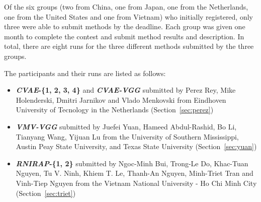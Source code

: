 \documentclass[../main.tex]{subfiles}
\begin{document}
Of the six groups (two from China, one from Japan, one from the Netherlands, one from the United States and one from Vietnam) who initially registered, only three were able to submit methods by the deadline. Each group was given one month to complete the contest and  submit method results and description. In total, there are eight runs for the three different methods submitted by the three groups. 

The participants and their runs are listed as follows:

\begin{itemize}
	
	\item  \textbf{\textit{CVAE}-\{1, 2, 3, 4\} } and \textbf{\textit{CVAE-VGG}} submitted by Perez Rey, Mike Holenderski, Dmitri Jarnikov and Vlado Menkovski from Eindhoven University of Tecnology in the Netherlands (Section~\ref{sec:perez})
	
	\item  \textbf{\textit{VMV-VGG}} submitted by Juefei Yuan, Hameed Abdul-Rashid, Bo Li, Tianyang Wang, Yijuan Lu from the University of Southern Mississippi, Austin Peay State University, and Texas State University (Section~\ref{sec:yuan})
	
	\item  \textbf{\textit{RNIRAP}-\{1, 2\}} submitted by 
	Ngoc-Minh Bui, Trong-Le Do, Khac-Tuan Nguyen, Tu V. Ninh, Khiem T. Le, Thanh-An Nguyen, Minh-Triet Tran and Vinh-Tiep Nguyen from the Vietnam National University - Ho Chi Minh City (Section~\ref{sec:triet})

\end{itemize}
\end{document}
